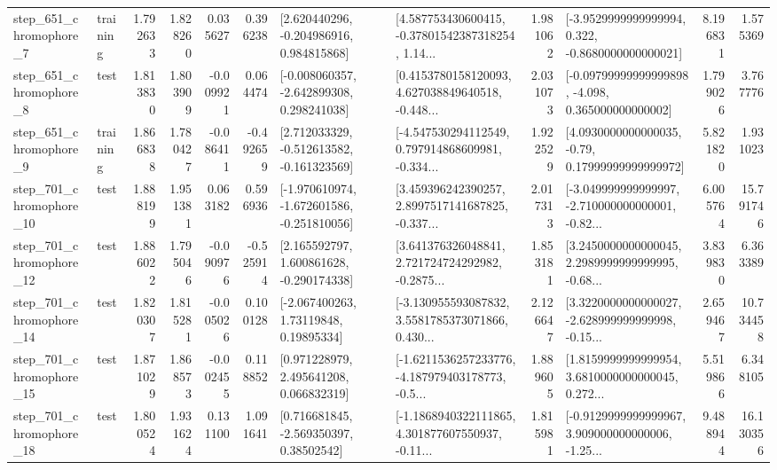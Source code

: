 \begin{tabular}{llrrrrllrlrr}
   step\_651\_chromophore\_7 &  training &      1.792633 &    1.828260 &      0.035627 &  0.396238 &    [2.620440296, -0.204986916, 0.984815868] &  [4.587753430600415, -0.37801542387318254, 1.14... &       1.981062 &  [-3.9529999999999994, 0.322, -0.8680000000000021] &            8.196831 &          1.575369 \\
   step\_651\_chromophore\_8 &      test &      1.813830 &    1.803909 &     -0.009921 &  0.064474 &   [-0.008060357, -2.642899308, 0.298241038] &  [0.4153780158120093, 4.627038849640518, -0.448... &       2.031073 &  [-0.09799999999999898, -4.098, 0.365000000000002] &            1.799026 &          3.767776 \\
   step\_651\_chromophore\_9 &  training &      1.866838 &    1.780427 &     -0.086411 & -0.492659 &   [2.712033329, -0.512613582, -0.161323569] &  [-4.547530294112549, 0.797914868609981, -0.334... &       1.922529 &   [4.0930000000000035, -0.79, 0.17999999999999972] &            5.821820 &          1.931023 \\
  step\_701\_chromophore\_10 &      test &      1.888199 &    1.951381 &      0.063182 &  0.596936 &  [-1.970610974, -1.672601586, -0.251810056] &  [3.459396242390257, 2.8997517141687825, -0.337... &       2.017313 &  [-3.049999999999997, -2.710000000000001, -0.82... &            6.005764 &         15.791746 \\
  step\_701\_chromophore\_12 &      test &      1.886022 &    1.795046 &     -0.090976 & -0.525914 &    [2.165592797, 1.600861628, -0.290174338] &  [3.641376326048841, 2.721724724292982, -0.2875... &       1.853181 &  [3.2450000000000045, 2.2989999999999995, -0.68... &            3.839830 &          6.363389 \\
  step\_701\_chromophore\_14 &      test &      1.820307 &    1.815281 &     -0.005026 &  0.100128 &      [-2.067400263, 1.73119848, 0.19895334] &  [-3.130955593087832, 3.5581785373071866, 0.430... &       2.126647 &  [3.3220000000000027, -2.628999999999998, -0.15... &            2.659467 &         10.734458 \\
  step\_701\_chromophore\_15 &      test &      1.871029 &    1.868573 &     -0.002455 &  0.118852 &     [0.971228979, 2.495641208, 0.066832319] &  [-1.6211536257233776, -4.187979403178773, -0.5... &       1.889605 &  [1.8159999999999954, 3.6810000000000045, 0.272... &            5.519866 &          6.348105 \\
  step\_701\_chromophore\_18 &      test &      1.800524 &    1.931624 &      0.131100 &  1.091641 &     [0.716681845, -2.569350397, 0.38502542] &  [-1.1868940322111865, 4.301877607550937, -0.11... &       1.815981 &  [-0.9129999999999967, 3.909000000000006, -1.25... &            9.488944 &         16.130356 \\

\end{tabular}

